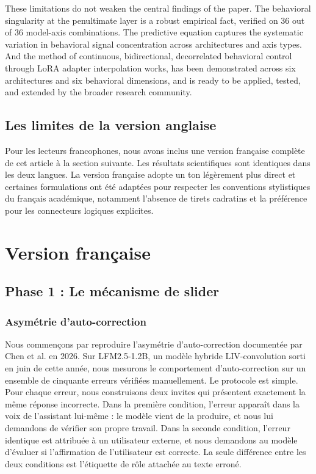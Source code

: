 \documentclass[11pt,a4paper]{article}
\begin{document}
These limitations do not weaken the central findings of the paper. The behavioral singularity at the penultimate layer is a robust empirical fact, verified on 36 out of 36 model-axis combinations. The predictive equation captures the systematic variation in behavioral signal concentration across architectures and axis types. And the method of continuous, bidirectional, decorrelated behavioral control through LoRA adapter interpolation works, has been demonstrated across six architectures and six behavioral dimensions, and is ready to be applied, tested, and extended by the broader research community.

\subsection{Les limites de la version anglaise}

Pour les lecteurs francophones, nous avons inclus une version française complète de cet article à la section suivante. Les résultats scientifiques sont identiques dans les deux langues. La version française adopte un ton légèrement plus direct et certaines formulations ont été adaptées pour respecter les conventions stylistiques du français académique, notamment l'absence de tirets cadratins et la préférence pour les connecteurs logiques explicites.

\newpage

\section{Version française}
\label{sec:french}

\clearpage

\subsection{Phase 1 : Le mécanisme de slider}

\subsubsection{Asymétrie d'auto-correction}

Nous commençons par reproduire l'asymétrie d'auto-correction documentée par Chen et al. en 2026. Sur LFM2.5-1.2B, un modèle hybride LIV-convolution sorti en juin de cette année, nous mesurons le comportement d'auto-correction sur un ensemble de cinquante erreurs vérifiées manuellement. Le protocole est simple. Pour chaque erreur, nous construisons deux invites qui présentent exactement la même réponse incorrecte. Dans la première condition, l'erreur apparaît dans la voix de l'assistant lui-même : le modèle vient de la produire, et nous lui demandons de vérifier son propre travail. Dans la seconde condition, l'erreur identique est attribuée à un utilisateur externe, et nous demandons au modèle d'évaluer si l'affirmation de l'utilisateur est correcte. La seule différence entre les deux conditions est l'étiquette de rôle attachée au texte erroné.
\end{document}
